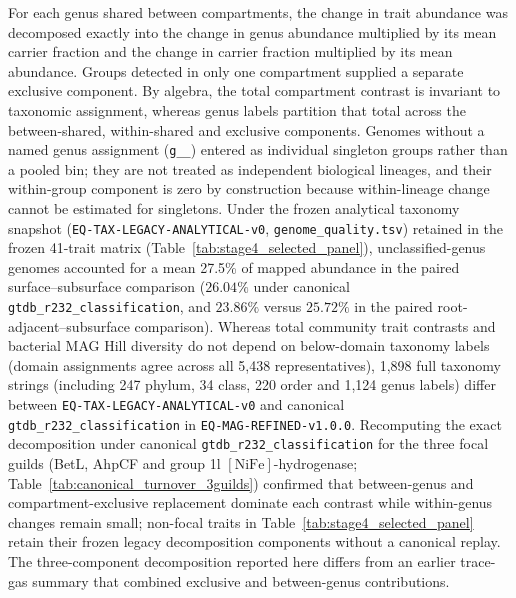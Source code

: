 {For each genus shared between compartments, the change in trait abundance was decomposed exactly into the change in genus abundance multiplied by its mean carrier fraction and the change in carrier fraction multiplied by its mean abundance. Groups detected in only one compartment supplied a separate exclusive component. By algebra, the total compartment contrast is invariant to taxonomic assignment, whereas genus labels partition that total across the between-shared, within-shared and exclusive components. Genomes without a named genus assignment (\texttt{g\_\_}) entered as individual singleton groups rather than a pooled bin; they are not treated as independent biological lineages, and their within-group component is zero by construction because within-lineage change cannot be estimated for singletons. Under the frozen analytical taxonomy snapshot (\texttt{EQ-\allowbreak TAX-\allowbreak LEGACY-\allowbreak ANALYTICAL-\allowbreak v0}, \texttt{genome\_\allowbreak quality.tsv}) retained in the frozen 41-trait matrix (Table~\ref{tab:stage4_selected_panel}), unclassified-genus genomes accounted for a mean 27.5\% of mapped abundance in the paired surface--subsurface comparison ($26.04\%$ under canonical \texttt{gtdb\_\allowbreak r232\_\allowbreak classification}, and $23.86\%$ versus $25.72\%$ in the paired root-adjacent--subsurface comparison). Whereas total community trait contrasts and bacterial MAG Hill diversity do not depend on below-domain taxonomy labels (domain assignments agree across all 5,438 representatives), 1,898 full taxonomy strings (including 247 phylum, 34 class, 220 order and 1,124 genus labels) differ between \texttt{EQ-\allowbreak TAX-\allowbreak LEGACY-\allowbreak ANALYTICAL-\allowbreak v0} and canonical \texttt{gtdb\_\allowbreak r232\_\allowbreak classification} in \texttt{EQ-\allowbreak MAG-\allowbreak REFINED-\allowbreak v1.0.0}. Recomputing the exact decomposition under canonical \texttt{gtdb\_\allowbreak r232\_\allowbreak classification} for the three focal guilds (BetL, AhpCF and group 1l $[\mathrm{NiFe}]$-hydrogenase; Table~\ref{tab:canonical_turnover_3guilds}) confirmed that between-genus and compartment-exclusive replacement dominate each contrast while within-genus changes remain small; non-focal traits in Table~\ref{tab:stage4_selected_panel} retain their frozen legacy decomposition components without a canonical replay. The three-component decomposition reported here differs from an earlier trace-gas summary that combined exclusive and between-genus contributions.

}
